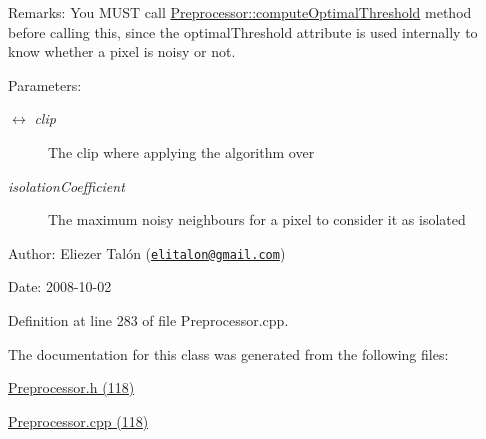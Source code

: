 \begin{Desc}
\item[Remarks:]You MUST call \hyperlink{class_preprocessor_84fcd2ccbbecea37f4bcdae5d7547ecd}{Preprocessor::computeOptimalThreshold} method before calling this, since the optimalThreshold attribute is used internally to know whether a pixel is noisy or not.\end{Desc}
\begin{Desc}
\item[Parameters:]
\begin{description}
\item[\mbox{$\leftrightarrow$} {\em clip}]The clip where applying the algorithm over \item[{\em isolationCoefficient}]The maximum noisy neighbours for a pixel to consider it as isolated\end{description}
\end{Desc}
\begin{Desc}
\item[Author:]Eliezer Talón (\href{mailto:elitalon@gmail.com}{\tt elitalon@gmail.com}) \end{Desc}
\begin{Desc}
\item[Date:]2008-10-02 \end{Desc}


Definition at line 283 of file Preprocessor.cpp.

The documentation for this class was generated from the following files:\begin{CompactItemize}
\item 
\hyperlink{_preprocessor_8h}{Preprocessor.h (118)}\item 
\hyperlink{_preprocessor_8cpp}{Preprocessor.cpp (118)}\end{CompactItemize}
